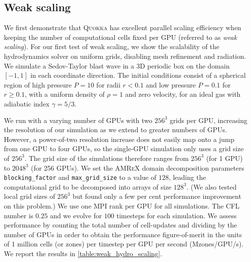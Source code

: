 \documentclass[fleqn,usenatbib]{mnras}
\begin{document}
\label{section:performance}
\subsection{Weak scaling}
We first demonstrate that \textsc{Quokka} has excellent parallel scaling efficiency when keeping the number of computational cells fixed per GPU (referred to as \emph{weak scaling}). For our first test of weak scaling, we show the scalability of the hydrodynamics solver on uniform grids, disabling mesh refinement and radiation. We simulate a Sedov-Taylor blast wave \citep{Sedov_1959,Taylor_1946} in a 3D periodic box on the domain $[-1, 1]$ in each coordinate direction. The initial conditions consist of a spherical region of high pressure $P = 10$ for radii $r < 0.1$ and low pressure $P = 0.1$ for $r \ge 0.1$, with a uniform density of $\rho = 1$ and zero velocity, for an ideal gas with adiabatic index $\gamma = 5/3$.

We run with a varying number of GPUs with two $256^3$ grids per GPU, increasing the resolution of our simulation as we extend to greater numbers of GPUs. However, a power-of-two resolution increase does not easily map onto a jump from one GPU to four GPUs, so the single-GPU simulation only uses a grid size of $256^3$. The grid size of the simulations therefore ranges from $256^3$ (for 1 GPU) to $2048^3$ (for 256 GPUs). We set the \textsc{AMReX} domain decomposition parameters \texttt{blocking\_factor} and \texttt{max\_grid\_size} to a value of $128$, leading the computational grid to be decomposed into arrays of size $128^3$. (We also tested local grid sizes of $256^3$ but found only a few per cent performance improvement on this problem.) We use one MPI rank per GPU for all simulations. The CFL number is $0.25$ and we evolve for $100$ timesteps for each simulation. We assess performance by counting the total number of cell-updates and dividing by the number of GPUs in order to obtain the performance figure-of-merit in the units of 1 million cells (or zones) per timestep per GPU per second (Mzones/GPU/s).  We report the results in \autoref{table:weak_hydro_scaling}. 
\end{document}
